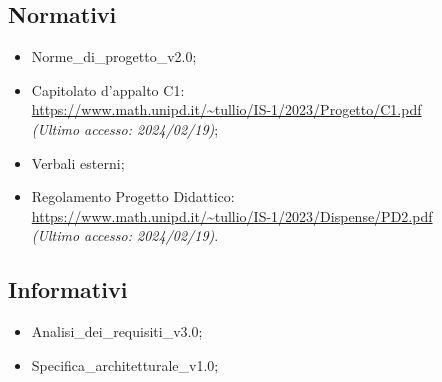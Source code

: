 \subsection{Normativi}
\begin{itemize}
    \item Norme\_di\_progetto\_v2.0;
    \item Capitolato d'appalto C1: \\ \url{https://www.math.unipd.it/~tullio/IS-1/2023/Progetto/C1.pdf} \\ \textit{(Ultimo accesso: 2024/02/19)};
    \item Verbali esterni;
    \item Regolamento Progetto Didattico: \\
    \url{https://www.math.unipd.it/~tullio/IS-1/2023/Dispense/PD2.pdf} \\ \textit{(Ultimo accesso: 2024/02/19)}.
\end{itemize}

\subsection{Informativi}
\begin{itemize}
    \item Analisi\_dei\_requisiti\_v3.0;
    \item Specifica\_architetturale\_v1.0;
\end{itemize}
